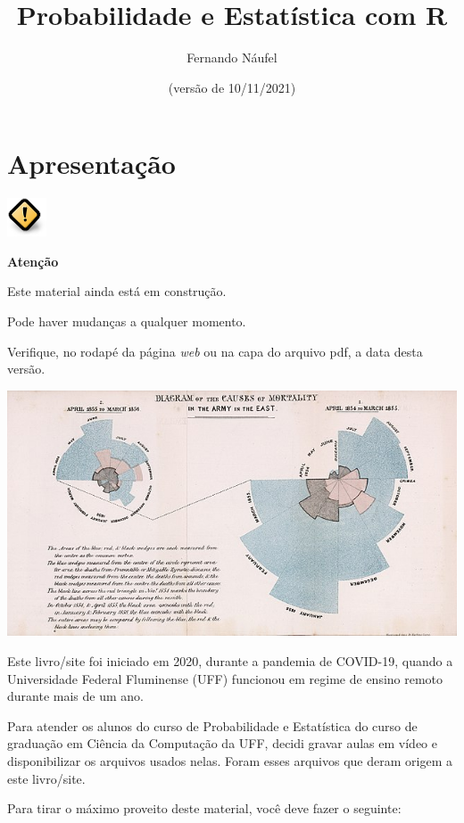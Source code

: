 \documentclass[
  11pt]{report}
\title{Probabilidade e Estatística com R}
\author{Fernando Náufel}
\date{(versão de 10/11/2021)}
\newenvironment{rmdcaution}
{
  \begin{mycaution}
    \includegraphics{images/caution.png}
    \tcblower
  }
  {
  \end{mycaution}
}
\begin{document}
\maketitle

{
\setcounter{tocdepth}{1}
\tableofcontents
}
\hypertarget{apresentacao}{%
\chapter*{Apresentação}\label{apresentacao}}

\begin{rmdcaution}
\textbf{Atenção}

Este material ainda está em construção.

Pode haver mudanças a qualquer momento.

Verifique, no rodapé da página \emph{web} ou na capa do arquivo pdf, a data desta versão.

\end{rmdcaution}

\includegraphics{images/640px-Nightingale-mortality.jpg}

Este livro/site foi iniciado em 2020, durante a pandemia de COVID-19, quando a Universidade Federal Fluminense (UFF) funcionou em regime de ensino remoto durante mais de um ano.

Para atender os alunos do curso de Probabilidade e Estatística do curso de graduação em Ciência da Computação da UFF, decidi gravar aulas em vídeo e disponibilizar os arquivos usados nelas. Foram esses arquivos que deram origem a este livro/site.

Para tirar o máximo proveito deste material, você deve fazer o seguinte:
\end{document}

